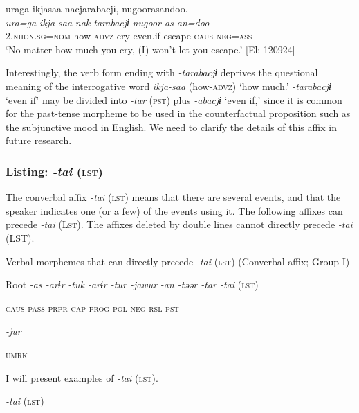 \ex
{\TM}
\glll  uraga  ikjasaa  nacjarabacjɨ,  nugoorasandoo.\\
\textit{ura=ga}  \textit{ikja-saa}  \textit{nak-tarabacjɨ}  \textit{nugoor-as-an=doo}\\
2.\textsc{nhon}.\textsc{sg}=\textsc{nom}  how-\textsc{advz}  cry-even.if  escape-\textsc{caus}-\textsc{neg}=\textsc{ass}\\
\glt ‘No matter how much you cry, (I) won’t let you escape.’ [El: 120924]
\z
\z

Interestingly, the verb form ending with \textit{-tarabacjɨ} deprives the questional meaning of the interrogative word \textit{ikja-saa} (how-\textsc{advz}) ‘how much.’ \textit{-tarabacjɨ} ‘even if’ may be divided into \textit{-tar} (\textsc{pst}) plus \textit{-abacjɨ} ‘even if,’ since it is common for the past-tense morpheme to be used in the counterfactual proposition such as the subjunctive mood in English. We need to clarify the details of this affix in future research.

\subsubsection{Listing: \textit{-tai} (\textsc{lst})}

The converbal affix \textit{-tai} (\textsc{lst}) means that there are several events, and that the speaker indicates one (or a few) of the events using it. The following affixes can precede \textit{-tai} (L\textsc{st}). The affixes deleted by double lines cannot directly precede \textit{-tai} (LST).

\ea\label{ex:8-92}
  Verbal morphemes that can directly precede \textit{-tai} (\textsc{lst}) (Converbal affix; Group I)

  Root  \textit{-as  -arɨr} %
\textit{-tuk  -arɨr  -tur  -jawur} %
\textit{-an  -təər  -tar  -tai} (\textsc{lst})

    \textsc{caus}  \textsc{pass}  \textsc{prpr}  \textsc{cap}  \textsc{prog}  \textsc{pol}  \textsc{neg}  \textsc{rsl}  \textsc{pst}

          \textit{-jur}

          \textsc{umrk}
\z

I will present examples of \textit{-tai} (\textsc{lst}).

\ea\label{ex:8-93}
  \textit{-tai} (\textsc{lst})

